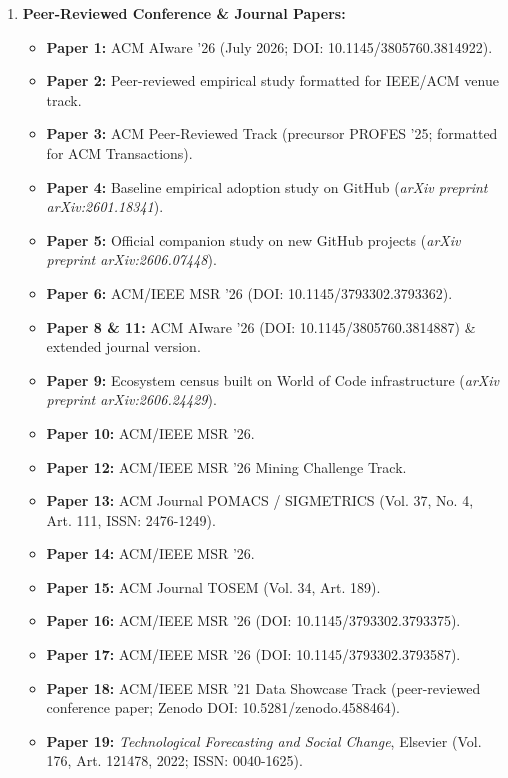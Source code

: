 \documentclass[11pt,a4paper]{article}
\begin{document}
\begin{enumerate}[leftmargin=1.5em, itemsep=3pt]
    \item \textbf{Peer-Reviewed Conference \& Journal Papers:}
    \begin{itemize}
        \item \textbf{Paper 1:} ACM AIware '26 (July 2026; DOI: 10.1145/3805760.3814922).
        \item \textbf{Paper 2:} Peer-reviewed empirical study formatted for IEEE/ACM venue track.
        \item \textbf{Paper 3:} ACM Peer-Reviewed Track (precursor PROFES '25; formatted for ACM Transactions).
        \item \textbf{Paper 4:} Baseline empirical adoption study on GitHub (\textit{arXiv preprint arXiv:2601.18341}).
        \item \textbf{Paper 5:} Official companion study on new GitHub projects (\textit{arXiv preprint arXiv:2606.07448}).
        \item \textbf{Paper 6:} ACM/IEEE MSR '26 (DOI: 10.1145/3793302.3793362).
        \item \textbf{Paper 8 \& 11:} ACM AIware '26 (DOI: 10.1145/3805760.3814887) \& extended journal version.
        \item \textbf{Paper 9:} Ecosystem census built on World of Code infrastructure (\textit{arXiv preprint arXiv:2606.24429}).
        \item \textbf{Paper 10:} ACM/IEEE MSR '26.
        \item \textbf{Paper 12:} ACM/IEEE MSR '26 Mining Challenge Track.
        \item \textbf{Paper 13:} ACM Journal POMACS / SIGMETRICS (Vol. 37, No. 4, Art. 111, ISSN: 2476-1249).
        \item \textbf{Paper 14:} ACM/IEEE MSR '26.
        \item \textbf{Paper 15:} ACM Journal TOSEM (Vol. 34, Art. 189).
        \item \textbf{Paper 16:} ACM/IEEE MSR '26 (DOI: 10.1145/3793302.3793375).
        \item \textbf{Paper 17:} ACM/IEEE MSR '26 (DOI: 10.1145/3793302.3793587).
        \item \textbf{Paper 18:} ACM/IEEE MSR '21 Data Showcase Track (peer-reviewed conference paper; Zenodo DOI: 10.5281/zenodo.4588464).
        \item \textbf{Paper 19:} \textit{Technological Forecasting and Social Change}, Elsevier (Vol. 176, Art. 121478, 2022; ISSN: 0040-1625).

\end{itemize}
\end{enumerate}
\end{document}
